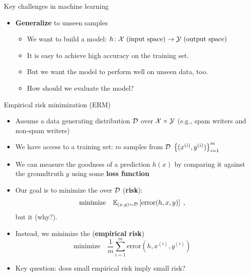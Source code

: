 \documentclass[usenames,dvipsnames,notes,11pt,aspectratio=169]{beamer}
\begin{document}
\begin{frame}
    {Key challenges in machine learning}
    \begin{itemize}
        \item \textbf{Generalize} to unseen samples
            \begin{itemize}
                \item We want to build a model: $h\colon \mathcal{X} \text{ (input space)} \rightarrow \mathcal{Y} \text{ (output space)}$
                \item It is easy to achieve high accuracy on the training set.
                \item But we want the model to perform well on unseen data, too.
                \item How should we evaluate the model? 
            \end{itemize}
    \end{itemize}
\end{frame}

\begin{frame}
    {Empirical risk minimization (ERM)}

    \begin{itemize}[<+->]
        \item Assume a data generating distribution $\mathcal{D}$ over $\mathcal{X}\times\mathcal{Y}$ (e.g., spam writers and non-spam writers)
        \item We have access to a training set: $m$ samples from $\mathcal{D}$ $\left\{ (x^{(i)}, y^{(i)}) \right\}_{i=1}^m$
        \item We can measure the goodness of a prediction $h(x)$ by comparing it against the groundtruth $y$ using some \textbf{loss function}
        \item Our goal is to minimize the  over $\mathcal{D}$ (\textbf{risk}):
            $$
\text{minimize}\quad \mathbb{E}_{(x,y)\sim\mathcal{D}}\left[ \mathrm{error}(h,x,y) \right] \;,
            $$
            but it  (why?).
\item Instead, we minimize the  (\textbf{empirical risk})  %
    $$
    \text{minimize}\quad \frac{1}{m}\sum_{i=1}^m \mathrm{error}(h, x^{(i)}, y^{(i)})
    $$

        \item Key question: does small empirical risk imply small risk? 
    \end{itemize}
\end{frame}
\end{document}
